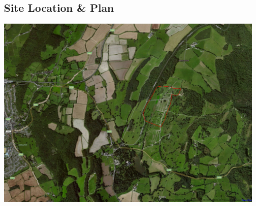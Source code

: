 \pagestyle{empty}
\begin{landscape}
\section{Site Location \& Plan}
\label{site-plan}
\includegraphics[width=24cm]{./supplementary/wide-map.png}
\end{landscape}





